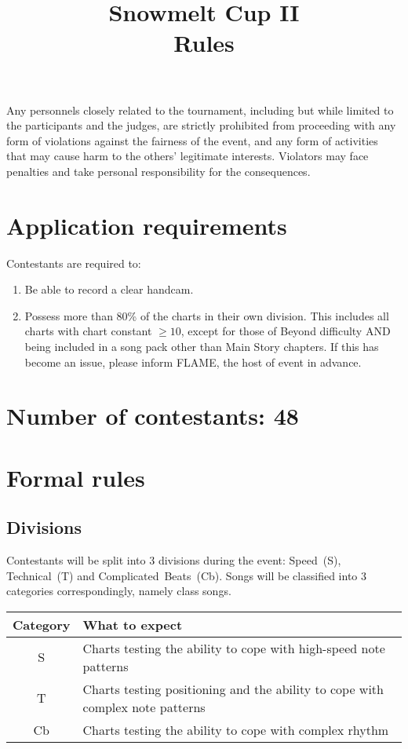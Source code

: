 \documentclass{article}
\title{{Snowmelt Cup II}\\{\Huge Rules}}
\author{}
\date{}
\newcommand{\alert}[1]{{\color{red} #1}}
\begin{document}
\maketitle
\alert{
	Any personnels
	closely related to the tournament,
	including but while limited to
	the participants and the judges,
	are strictly prohibited from
	proceeding with any form of
	violations against the fairness of the event,
	and any form of activities that
	may cause harm to the others' legitimate interests.
	Violators may face penalties
	and take personal responsibility for the consequences.
}

\section{Application requirements} \label{sec:application-requirements}

Contestants are required to:

\begin{enumerate}
	\item Be able to record a clear handcam.
	\item Possess more than 80\% of the charts
	      in their own division.
	      This includes all charts with
	      chart constant $\geq 10$,
	      except for those of Beyond difficulty
	      AND being included in a song pack other than
	      Main Story chapters.
	      If this has become an issue,
	      please inform FLAME, the host of event in advance.
\end{enumerate}

\section{Number of contestants: 48}

\section{Formal rules}

\subsection{Divisions}

Contestants will be split into 3 divisions during the event:
Speed~(S), Technical~(T) and Complicated~Beats~(Cb).
Songs will be classified
into 3 categories correspondingly,
namely class songs.

\begin{table}[!htbp]
	\centering
	\begin{tabular}{cl}
		\hline
		Category & What to expect                                                                \\ \hline
		S        & Charts testing the ability to cope with high-speed note patterns              \\
		T        & Charts testing positioning and the ability to cope with complex note patterns \\
		Cb       & Charts testing the ability to cope with complex rhythm                        \\ \hline
	\end{tabular}
\end{table}
\end{document}
